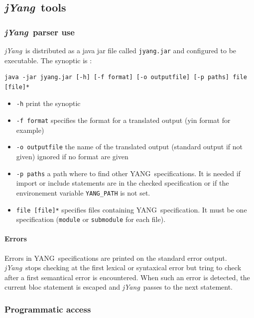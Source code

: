 \documentclass[a4paper]{article}
\newcommand{\jyang}{{\sl jYang}}
\newcommand{\y}{YANG}
\begin{document}
\subsection{\jyang\ tools}

\subsubsection{\jyang\ parser use}

\jyang\ is distributed  as a java jar file  called {\tt jyang.jar} and
configured to be executable. The synoptic is :

\begin{verbatim}
java -jar jyang.jar [-h] [-f format] [-o outputfile] [-p paths] file [file]*
\end{verbatim}

\begin{itemize}
\item
{\tt -h} print the synoptic
\item
{\tt  -f format}  specifies the  format for  a translated  output (yin
format for example)
\item
{\tt -o outputfile} the name of the translated output (standard output
if not given) ignored if no format are given
\item
{\tt -p  paths} a path where  to find other \y\  specifications. It is
needed   if  import  or   include  statements   are  in   the  checked
specification or  if the environement variable {\tt  YANG\_PATH} is not
set.
\item
{\tt file  [file]*} specifies  files containing \y\  specification. It
must be  one specification ({\tt  module} or {\tt submodule}  for each
file).
\end{itemize}

\paragraph{Errors}

Errors in \y\ specifications are printed on the standard error output.
\jyang\ stops  checking at the  first lexical or syntaxical  error but
tring to  check after  a first semantical  error is  encountered. When
such an error  is detected, the current bloc  statement is escaped and
\jyang\ passes to the next statement.

\subsubsection{Programmatic access}
\end{document}
